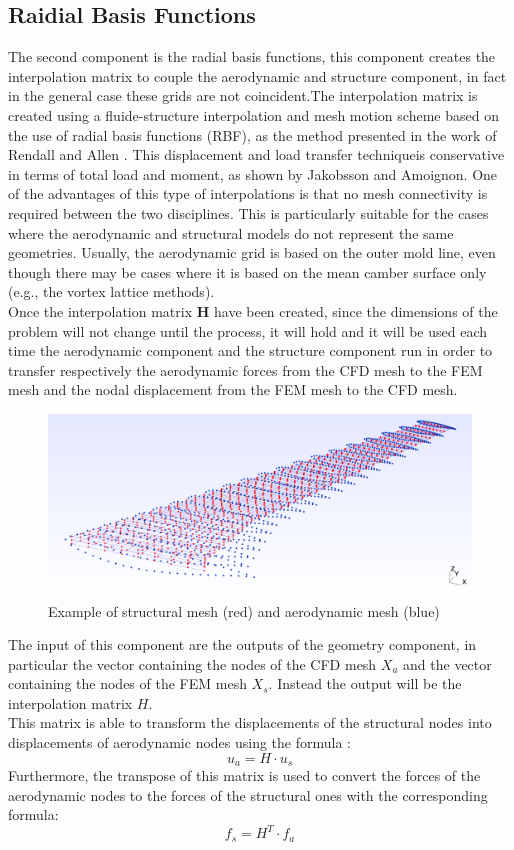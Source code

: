 \subsection{Raidial Basis Functions}
The second component is the radial basis functions, this component creates the interpolation matrix to couple the aerodynamic and structure component, in fact in the general case these grids are not coincident.The interpolation matrix is created using a fluide-structure interpolation and mesh motion scheme based on the use of radial basis functions (RBF), as the method presented in the work of Rendall and Allen \cite{all}. This displacement and load transfer techniqueis conservative in terms of total load and moment, as shown by Jakobsson and Amoignon. \cite{jac} One of the advantages of this type of interpolations is that no mesh connectivity is required between the two disciplines. This is particularly suitable for the cases where the aerodynamic and structural models do not represent the same geometries. Usually, the aerodynamic grid is based on the outer mold line, even though there may be cases where it is based on the mean camber surface only (e.g., the vortex lattice methods).\cite{joan}\\Once the interpolation matrix \textbf{H} have been created, since the dimensions of the problem will not change until the process, it will hold and it will be used each time the aerodynamic component and the structure component run in order to transfer respectively the aerodynamic forces from the CFD mesh to the FEM mesh and the nodal displacement from the FEM mesh to the CFD mesh.\\
\begin{figure}[H]
	\centering
	\includegraphics[width = 1\textwidth]{./Immagini/2_3.png}
	\caption{Example of structural mesh (red) and aerodynamic mesh (blue)}
	\label{fig:2_3}
\end{figure}
The input of this component are the outputs of the geometry component, in particular the vector containing the nodes of the CFD mesh $ X_a $ and the vector containing the nodes of the FEM mesh $ X_s $. Instead the output will be the interpolation matrix $ H $. \\This matrix is able to transform the displacements of the structural nodes into displacements of aerodynamic nodes using the formula :
\begin{equation*}
u_a = H \cdot u_s
\end{equation*}
Furthermore, the transpose of this matrix is used to convert the forces of the aerodynamic nodes to the forces of the structural ones with the corresponding formula:
\begin{equation*}
f_s=H^T \cdot f_a
\end{equation*}
